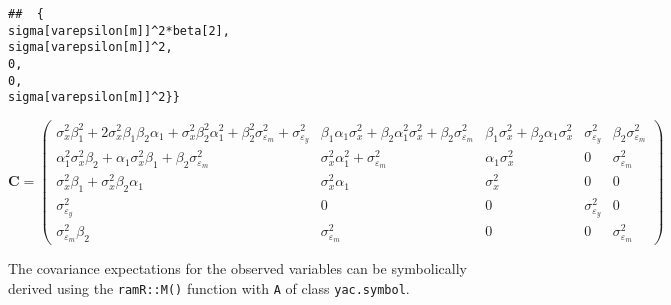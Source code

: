 \documentclass[
]{book}
\theoremstyle{definition}
\theoremstyle{definition}
\theoremstyle{definition}
\theoremstyle{remark}
\begin{document}
\begin{verbatim}
##  {                                                                                                                    sigma[varepsilon[m]]^2*beta[2],                                                                                                                             sigma[varepsilon[m]]^2,                                                                                                                                                  0,                                                                                                                                                  0,                                                                                                                             sigma[varepsilon[m]]^2}}
\end{verbatim}

\begin{equation*}\mathbf{C} =\left( \begin{array}{ccccc} \sigma  _{x} ^{2} \beta  _{1} ^{2} + 2 \sigma  _{x} ^{2} \beta  _{1} \beta  _{2} \alpha  _{1} + \sigma  _{x} ^{2} \beta  _{2} ^{2} \alpha  _{1} ^{2} + \beta  _{2} ^{2} \sigma  _{\varepsilon  _{m}} ^{2} + \sigma  _{\varepsilon  _{y}} ^{2} & \beta  _{1} \alpha  _{1} \sigma  _{x} ^{2} + \beta  _{2} \alpha  _{1} ^{2} \sigma  _{x} ^{2} + \beta  _{2} \sigma  _{\varepsilon  _{m}} ^{2} & \beta  _{1} \sigma  _{x} ^{2} + \beta  _{2} \alpha  _{1} \sigma  _{x} ^{2} & \sigma  _{\varepsilon  _{y}} ^{2} & \beta  _{2} \sigma  _{\varepsilon  _{m}} ^{2} \\ \alpha  _{1} ^{2} \sigma  _{x} ^{2} \beta  _{2} + \alpha  _{1} \sigma  _{x} ^{2} \beta  _{1} + \beta  _{2} \sigma  _{\varepsilon  _{m}} ^{2} & \sigma  _{x} ^{2} \alpha  _{1} ^{2} + \sigma  _{\varepsilon  _{m}} ^{2} & \alpha  _{1} \sigma  _{x} ^{2} & 0 & \sigma  _{\varepsilon  _{m}} ^{2} \\ \sigma  _{x} ^{2} \beta  _{1} + \sigma  _{x} ^{2} \beta  _{2} \alpha  _{1} & \sigma  _{x} ^{2} \alpha  _{1} & \sigma  _{x} ^{2} & 0 & 0 \\ \sigma  _{\varepsilon  _{y}} ^{2} & 0 & 0 & \sigma  _{\varepsilon  _{y}} ^{2} & 0 \\ \sigma  _{\varepsilon  _{m}} ^{2} \beta  _{2} & \sigma  _{\varepsilon  _{m}} ^{2} & 0 & 0 & \sigma  _{\varepsilon  _{m}} ^{2} \end{array} \right)\end{equation*}

The covariance expectations for the observed variables
can be symbolically derived using the \texttt{ramR::M()} function
with \texttt{A} of class \texttt{yac.symbol}.
\end{document}
